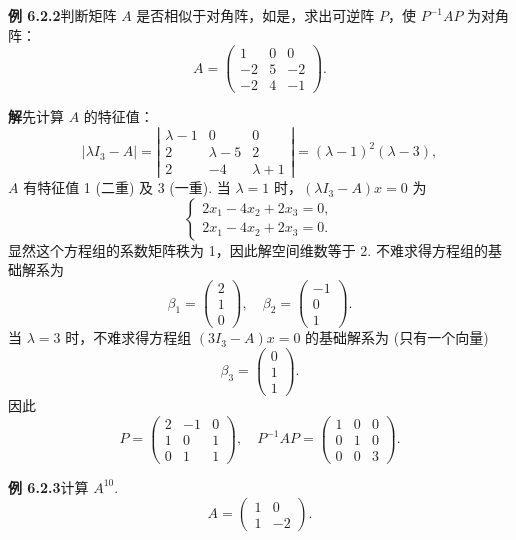 \documentclass[UTF8, 12pt, fontset=fandol, oneside]{ctexart}
\begin{document}
\noindent\textbf{例 6.2.2}\quad 判断矩阵 $A$ 是否相似于对角阵，如是，求出可逆阵 $P$，使 $P^{-1}AP$ 为对角阵：
\[
A=\left(\begin{array}{ccc}
1 & 0 & 0\\
-2 & 5 & -2\\
-2 & 4 & -1
\end{array}\right).
\]

\noindent\textbf{解}\quad 先计算 $A$ 的特征值：
\[
|\lambda I_3-A|=
\left|\begin{array}{ccc}
\lambda-1 & 0 & 0\\
2 & \lambda-5 & 2\\
2 & -4 & \lambda+1
\end{array}\right|
=(\lambda-1)^2(\lambda-3),
\]
$A$ 有特征值 1 (二重) 及 3 (一重). 当 $\lambda=1$ 时，$(\lambda I_3-A)x=0$ 为
\[
\left\{\begin{array}{l}
2x_1-4x_2+2x_3=0,\\
2x_1-4x_2+2x_3=0.
\end{array}\right.
\]
显然这个方程组的系数矩阵秩为 1，因此解空间维数等于 2. 不难求得方程组的基础解系为
\[
\beta_1=\left(\begin{array}{c}
2\\
1\\
0
\end{array}\right),\quad
\beta_2=\left(\begin{array}{c}
-1\\
0\\
1
\end{array}\right).
\]
当 $\lambda=3$ 时，不难求得方程组 $(3I_3-A)x=0$ 的基础解系为 (只有一个向量)
\[
\beta_3=\left(\begin{array}{c}
0\\
1\\
1
\end{array}\right).
\]
因此
\[
P=\left(\begin{array}{ccc}
2 & -1 & 0\\
1 & 0 & 1\\
0 & 1 & 1
\end{array}\right),\quad
P^{-1}AP=\left(\begin{array}{ccc}
1 & 0 & 0\\
0 & 1 & 0\\
0 & 0 & 3
\end{array}\right).
\]

\noindent\textbf{例 6.2.3}\quad 计算 $A^{10}$.
\[
A=\left(\begin{array}{cc}
1 & 0\\
1 & -2
\end{array}\right).
\]
\end{document}
